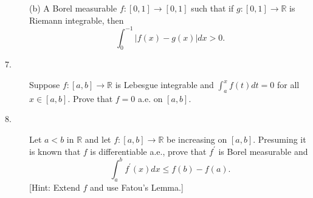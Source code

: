 \documentclass{article}
\def\R{\mathbb R}
\begin{document}
\begin{description}
\item[\quad] (b)
A Borel measurable $f:[0,1] \to [0,1]$ such that if $g:[0,1] \to \R$
is Riemann integrable, then
$$\int^{-1}_0 |f(x) - g(x)| dx >0.$$    

\item[7.]
Suppose $f:[a,b] \to \R$ is Lebesgue integrable and
$\int^x_a f(t) dt = 0$ for all $x \in [a,b]$. Prove that $f=0$ a.e.
on $[a,b].$

\item[8.]
Let $a<b$ in $\R$ and let $f:[a,b] \to \R$ be increasing on $[a,b]$. Presuming
it is known that $f$ is differentiable a.e., prove that $f^\prime$ is
Borel measurable and
$$\int^b_a f^\prime (x) dx \leq f(b) - f(a).$$
[Hint: Extend $f$ and use Fatou's Lemma.]





\end{description}    
\end{document}
